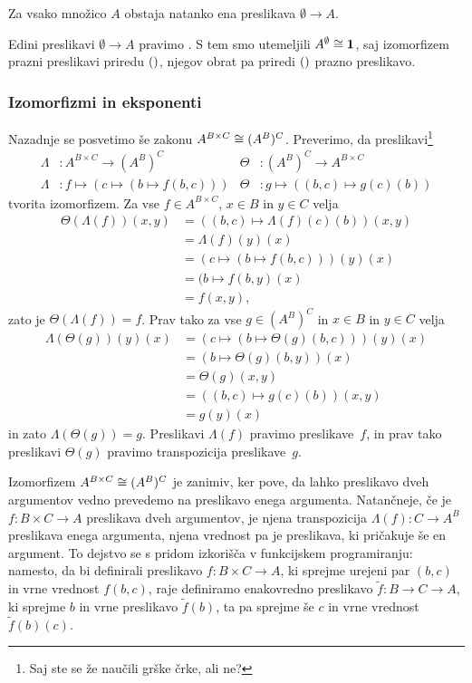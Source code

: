 \begin{trditev}
  Za vsako množico $A$ obstaja natanko ena preslikava $\emptyset \to A$.
\end{trditev}

Edini preslikavi $\emptyset \to A$ pravimo . S tem smo utemeljili
$A^\emptyset \cong \mathtt{\mathbf{1}}$, saj izomorfizem prazni preslikavi priredu
$\mathord{()}$, njegov obrat pa priredi $\mathord{()}$ prazno preslikavo.

\subsubsection{Izomorfizmi in eksponenti}
\label{sec:izomorfizmi-in-eksponenti}

Nazadnje se posvetimo še zakonu $A^{B \times C} \cong (A^B)^C$.
Preverimo, da preslikavi\footnote{Saj ste se že naučili grške črke, ali ne?}
%
\begin{align*}
  \Lambda &: A^{B \times C} \to (A^B)^C
  &
  \Theta &: (A^B)^C \to A^{B \times C}
  \\
  \Lambda &: f \mapsto (c \mapsto (b \mapsto f(b, c)))
  &
  \Theta &: g \mapsto ((b, c) \mapsto g(c)(b))
\end{align*}
%
tvorita izomorfizem. Za vse $f \in A^{B \times C}$, $x \in B$ in $y \in C$ velja
%
\begin{align*}
  \Theta(\Lambda(f))(x, y)
  &= ((b, c) \mapsto \Lambda(f)(c)(b)) (x, y)  \\
  &= \Lambda(f)(y)(x) \\
  &= (c \mapsto (b \mapsto f(b, c)))(y)(x) \\
  &= (b \mapsto f(b, y)(x) \\
  &= f(x, y),
\end{align*}
%
zato je $\Theta(\Lambda(f)) = f$. Prav tako za vse $g \in (A^B)^C$ in $x \in B$ in
$y \in C$ velja
%
\begin{align*}
  \Lambda(\Theta(g))(y)(x)
  &= (c \mapsto (b \mapsto \Theta(g)(b, c)))(y)(x) \\
  &= (b \mapsto \Theta(g)(b, y))(x) \\
  &= \Theta(g)(x, y) \\
  &= ((b, c) \mapsto g(c)(b)) (x, y) \\
  &= g(y)(x)
\end{align*}
%
in zato $\Lambda(\Theta(g)) = g$.
%
Preslikavi $\Lambda(f)$ pravimo  preslikave~$f$, in prav tako preslikavi
$\Theta(g)$ pravimo transpozicija preslikave~$g$.

Izomorfizem $A^{B \times C} \cong (A^B)^C$ je zanimiv, ker pove, da lahko preslikavo dveh
argumentov vedno prevedemo na preslikavo enega argumenta. Natančneje, če je
$f : B \times C \to A$ preslikava dveh argumentov, je njena transpozicija
$\Lambda(f) : C \to A^B$ preslikava enega argumenta, njena vrednost pa je preslikava, ki
pričakuje še en argument. To dejstvo se s pridom izkorišča v funkcijskem programiranju:
namesto, da bi definirali preslikavo $f : B \times C \to A$, ki sprejme urejeni par
$(b, c)$ in vrne vrednost $f(b,c)$, raje definiramo enakovredno preslikavo
$\tilde{f} : B \to C \to A$, ki sprejme $b$ in vrne preslikavo $\tilde{f}(b)$, ta pa
sprejme še $c$ in vrne vrednost $\tilde{f}(b)(c)$.


